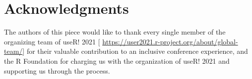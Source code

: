 \documentclass[10pt,letterpaper]{article}
\begin{document}
\section*{Acknowledgments}
The authors of this piece would like to thank every single member of the organizing team of useR! 2021 [ \url{https://user2021.r-project.org/about/global-team/}] for their valuable contribution to an inclusive conference experience, and the R Foundation for charging us with the organization of useR! 2021 and supporting us through the process. 








\end{document}
